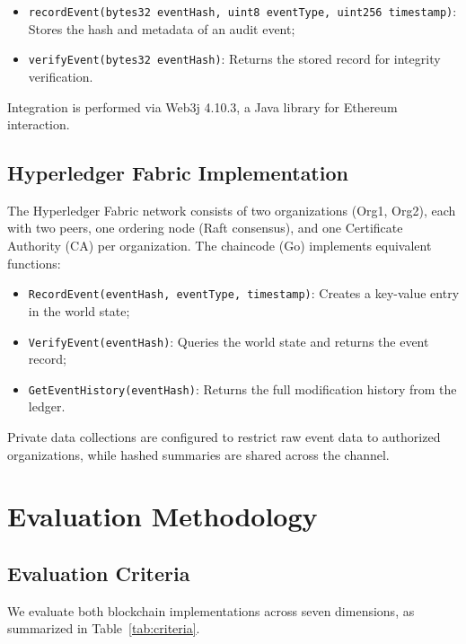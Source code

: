 \documentclass[12pt,a4paper]{article}
\begin{document}
\begin{itemize}
    \item \texttt{recordEvent(bytes32 eventHash, uint8 eventType, uint256 timestamp)}: Stores the hash and metadata of an audit event;
    \item \texttt{verifyEvent(bytes32 eventHash)}: Returns the stored record for integrity verification.
\end{itemize}

Integration is performed via Web3j 4.10.3, a Java library for Ethereum interaction.

\subsection{Hyperledger Fabric Implementation}

The Hyperledger Fabric network consists of two organizations (Org1, Org2), each with two peers, one ordering node (Raft consensus), and one Certificate Authority (CA) per organization. The chaincode (Go) implements equivalent functions:

\begin{itemize}
    \item \texttt{RecordEvent(eventHash, eventType, timestamp)}: Creates a key-value entry in the world state;
    \item \texttt{VerifyEvent(eventHash)}: Queries the world state and returns the event record;
    \item \texttt{GetEventHistory(eventHash)}: Returns the full modification history from the ledger.
\end{itemize}

Private data collections are configured to restrict raw event data to authorized organizations, while hashed summaries are shared across the channel.

\section{Evaluation Methodology}
\label{sec:methodology}

\subsection{Evaluation Criteria}

We evaluate both blockchain implementations across seven dimensions, as summarized in Table~\ref{tab:criteria}.
\end{document}
